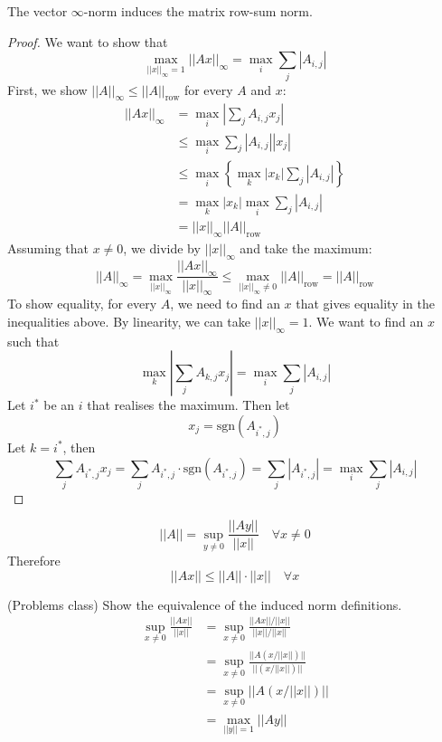 \begin{proposition}
	The vector $\infty$-norm induces the matrix row-sum norm.
\end{proposition}

\begin{proof}
	We want to show that
	\[
		\max_{||x||_{\infty} = 1} ||Ax||_{\infty} = \max_i \sum_j |A_{i, j}|
	\]
	First, we show $||A||_{\infty} \le ||A||_{\text{row}}$ for every $A$ and $x$:
	\[
		\begin{aligned}
			||Ax||_{\infty}
				& = \max_i \left| \sum_j A_{i, j} x_j \right| \\
				& \le \max_i \sum_j |A_{i, j}| |x_j| \\
				& \le \max_i \left\{ \max_k |x_k| \sum_j |A_{i, j}| \right\} \\
				& = \max_k |x_k| \max_i \sum_j |A_{i, j}| \\
				& = ||x||_{\infty} ||A||_{\text{row}}
		\end{aligned}
	\]
	Assuming that $x \ne 0$, we divide by $||x||_{\infty}$ and take the maximum:
	\[
		||A||_{\infty} = \max_{||x||_{\infty}} \frac{||Ax||_{\infty}}{||x||_{\infty}} \le \max_{||x||_{\infty} \ne 0} ||A||_{\text{row}} = ||A||_{\text{row}}
	\]
	To show equality, for every $A$, we need to find an $x$ that gives equality in the inequalities above. By linearity, we can take $||x||_{\infty} = 1$. We want to find an $x$ such that
	\[
		\max_k \left| \sum_j A_{k, j} x_j \right| = \max_i \sum_j |A_{i, j}|
	\]
	Let $i^*$ be an $i$ that realises the maximum. Then let
	\[
		x_j = \text{sgn} (A_{i^*, j})
	\]
	Let $k = i^*$, then
	\[
		\sum_j A_{i^*, j} x_j = \sum_j A_{i^*, j} \cdot \text{sgn} (A_{i^*, j}) = \sum_j |A_{i^*, j}| = \max_i \sum_j |A_{i, j}|
	\]
\end{proof}

\begin{remark}
	\[
		||A|| = \sup_{y \ne 0} \frac{||Ay||}{||x||} \quad \forall x \ne 0
	\]
	Therefore
	\[
		||Ax|| \le ||A|| \cdot ||x|| \quad \forall x
	\]
\end{remark}

\begin{example}
	(Problems class) Show the equivalence of the induced norm definitions.
	\[
		\begin{aligned}
			\sup_{x \ne 0} \frac{||Ax||}{||x||}
				& = \sup_{x \ne 0} \frac{||Ax|| / ||x||}{||x|| / ||x||} \\
				& = \sup_{x \ne 0} \frac{||A (x / ||x||)||}{||(x / ||x||)||} \\
				& = \sup_{x \ne 0} ||A(x / ||x||)|| \\
				& = \max_{||y|| = 1} ||Ay||
		\end{aligned}
	\]
\end{example}

